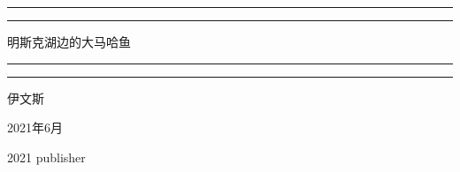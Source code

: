 
\begin{titlepage}
    \centering   %
    \scshape     %
    \vspace*{\baselineskip}   %

	
    \rule{\textwidth}{1.6pt}\vspace*{-\baselineskip}\vspace*{2pt} %
    \rule{\textwidth}{0.4pt}  %
	
    \vspace{0.75\baselineskip} %

    {\LARGE\heiti 明斯克湖边的大马哈鱼} %
	
	\vspace{0.75\baselineskip} %
	
	\rule{\textwidth}{0.4pt}\vspace*{-\baselineskip}\vspace{3.2pt} %
	\rule{\textwidth}{1.6pt} %
	
	\vspace{2\baselineskip} %
	
	
    {\fangsong\Large 伊文斯 \\[10pt] } %
	
    {\fangsong\large 2021年6月\\} %

	\vspace{0.5\baselineskip} %
	
	
	\vfill %
	
	
	\plogo %
	
	\vspace{0.3\baselineskip} %
	
	2021 %
	{\large publisher} %
\end{titlepage}
